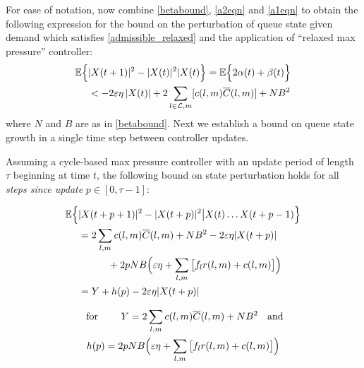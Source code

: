 For ease of notation, now combine \eqref{betabound}, \eqref{a2eqn} and \eqref{a1eqn} to obtain the following expression for the bound on the perturbation of queue state given demand which satisfies \eqref{admissible_relaxed} and the application of ``relaxed max pressure'' controller:
\begin{align}
\mathbb{E}\Big\{ &|X(t+1)|^{2} - |X(t)|^{2}  |   X(t) \Big\} = \mathbb{E}\Big\{ 2\alpha(t) + \beta(t) \Big\} \nonumber \\
&<  -2\varepsilon \eta \left| X(t ) \right| + 2 \sum_{l \in \mathcal{L},m} [c(l,m)\overline{C} (l,m) ]+ NB^{2}
\end{align}
where $N$ and $B$ are as in \eqref{betabound}. Next we establish a bound on queue state growth in a single time step between controller updates. 
\begin{Lem} \label{lemma_p} 
Assuming a cycle-based max pressure controller with an update period of length $\tau$ beginning at time $t$, the following bound on state perturbation holds for all \emph{steps since update} $p \in [0, \tau - 1]$:
\begin{small}
\begin{align} \label{pexpect} 
\expectation{&\vert X(t + p + 1)\vert^2 - \vert X(t + p)\vert^2 \big| X(t) \ldots X(t + p - 1)} \\ \nonumber
& = 2 \sum_{l,m} c(l,m)\overline{C}(l,m) + N B^2 -2\varepsilon \eta \vert X(t + p )\vert  \\
& \qquad \quad+ 2pNB\Big(\varepsilon\eta +  \sum_{l,m}\big[f_{l}r(l,m) + c(l,m)\big]\Big)  \label{boundCycleMP} \\
& =  Y + h(p) - 2\varepsilon \eta \vert X(t + p )\vert \nonumber
\end{align}\end{small}\begin{gather}
\text{ for \qquad} Y = 2 \sum_{l,m} c(l,m)\overline{C}(l,m) + N B^2  \text{ \; and} \\
h(p) =  2 pNB\Big(\varepsilon\eta +  \sum_{l,m}\big[f_{l}r(l,m) + c(l,m)\big]\Big)  
\end{gather}

\end{Lem}
